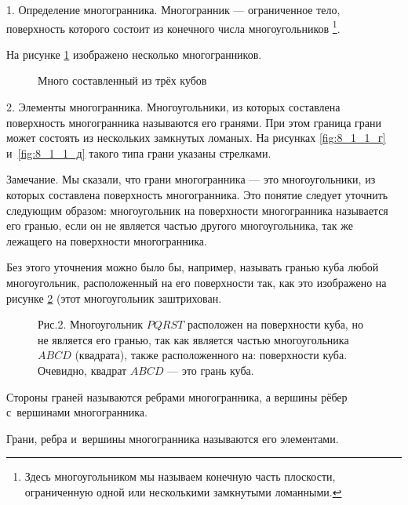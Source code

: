 
\par{1. Определение многогранника.}
Многогранник --- ограниченное тело, поверхность которого состоит из конечного
числа многоугольников
\footnote{Здесь многоугольником мы называем конечную часть плоскости,
ограниченную одной или несколькими замкнутыми ломанными.}.

На рисунке \ref{fig:8_1_1} изображено несколько многогранников.

\begin{figure}\label{fig:8_1_1}
\caption{Параллелепипед}
\caption{Призма}
\caption{Пирамида}
\caption{Параллелепипед с~прорезанным квадратным отверстием}
\caption{Много составленный из трёх кубов}
\end{figure}

\par{2. Элементы многогранника.}
Многоугольники, из которых составлена поверхность многогранника называются
его гранями. При этом граница грани может состоять из нескольких замкнутых
ломаных. На рисунках \ref{fig:8_1_1_г} и~\ref{fig:8_1_1_д} такого типа грани
указаны стрелками.
\begin{note}Замечание.
Мы сказали, что грани многогранника --- это многоугольники, из которых составлена
поверхность многогранника. Это понятие следует уточнить следующим образом:
многоугольник на поверхности многогранника называется его гранью, если он
не является частью другого многоугольника, так же лежащего на поверхности
многогранника.
\end{note}

Без этого уточнения можно было бы, например, называть гранью куба любой
многоугольник, расположенный на его поверхности так, как это изображено
на рисунке \ref{fig:8_1_2} (этот многоугольник заштрихован.

\begin{figure}\label{fig:8_1_2}
\caption{Рис.2. Многоугольник $PQRST$ расположен на поверхности куба, но не
является его гранью, так как является частью многоугольника $ABCD$ (квадрата),
также расположенного на: поверхности куба. Очевидно, квадрат $ABCD$ --- это
грань куба.}
\end{figure}

Стороны граней называются ребрами многогранника, а вершины рёбер с~вершинами
многогранника.

Грани, ребра и~вершины многогранника называются его элементами.

